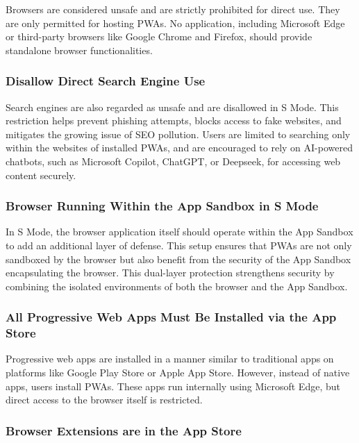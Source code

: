 Browsers are considered unsafe and are strictly prohibited for direct use. They are only permitted for hosting PWAs. No application, including Microsoft Edge or third-party browsers like Google Chrome and Firefox, should provide standalone browser functionalities.

\subsubsection{Disallow Direct Search Engine Use}

Search engines are also regarded as unsafe and are disallowed in S Mode. This restriction helps prevent phishing attempts, blocks access to fake websites, and mitigates the growing issue of SEO pollution\cite{10.1007/978-3-031-56063-7_4}. Users are limited to searching only within the websites of installed PWAs, and are encouraged to rely on AI-powered chatbots, such as Microsoft Copilot, ChatGPT, or Deepseek, for accessing web content securely.

\subsubsection{Browser Running Within the App Sandbox in S Mode}

In S Mode, the browser application itself should operate within the App Sandbox\cite{MicrosoftAppIsolationOverview} to add an additional layer of defense. This setup ensures that PWAs are not only sandboxed by the browser but also benefit from the security of the App Sandbox encapsulating the browser. This dual-layer protection strengthens security by combining the isolated environments of both the browser and the App Sandbox.

\subsubsection{All Progressive Web Apps Must Be Installed via the App Store}

Progressive web apps are installed in a manner similar to traditional apps on platforms like Google Play Store or Apple App Store. However, instead of native apps, users install PWAs. These apps run internally using Microsoft Edge, but direct access to the browser itself is restricted.

\subsubsection{Browser Extensions are in the App Store}

